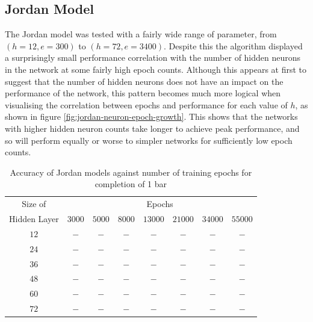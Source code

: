 \documentclass[ author={Stephen Livermore-Tozer},
				supervisor={Dr. Peter Flach},
				degree={MEng},
				title={Algorithmic Co-composition Using Machine Learning},
				subtitle={},
				type={research},
				year={2016} ]{dissertation}
\begin{document}
	
	\subsection{Jordan Model}
	\label{sec:objective-jordan}
	
	The Jordan model was tested with a fairly wide range of parameter, from $(h = 12, e = 300)$ to $(h = 72, e = 3400)$. Despite this the algorithm displayed a surprisingly small performance correlation with the number of hidden neurons in the network at some fairly high epoch counts. Although this appears at first to suggest that the number of hidden neurons does not have an impact on the performance of the network, this pattern becomes much more logical when visualising the correlation between epochs and performance for each value of $h$, as shown in figure \ref{fig:jordan-neuron-epoch-growth}. This shows that the networks with higher hidden neuron counts take longer to achieve peak performance, and so will perform equally or worse to simpler networks for sufficiently low epoch counts.
	
	\begin{table}[htp]
		\begin{center}
			\begin{tabular}{cccccccc}
				\toprule
				Size of& \multicolumn{7}{c}{Epochs}\\
				\cline{2-8}
				Hidden Layer& $3000$ & $5000$ & $8000$ & $13000$ & $21000$ & $34000$ & $55000$\\
				\hline
				$12$ & $-$ & $-$ & $-$ & $-$ & $-$ & $-$ & $-$\\
				$24$ & $-$ & $-$ & $-$ & $-$ & $-$ & $-$ & $-$\\
				$36$ & $-$ & $-$ & $-$ & $-$ & $-$ & $-$ & $-$\\
				$48$ & $-$ & $-$ & $-$ & $-$ & $-$ & $-$ & $-$\\
				$60$ & $-$ & $-$ & $-$ & $-$ & $-$ & $-$ & $-$\\
				$72$ & $-$ & $-$ & $-$ & $-$ & $-$ & $-$ & $-$\\
				\bottomrule
			\end{tabular}
		\end{center}
		\caption{Accuracy of Jordan models against number of training epochs for completion of 1 bar}
		\label{tab:jordan-1-bar-results}
	\end{table}
	
\end{document}
